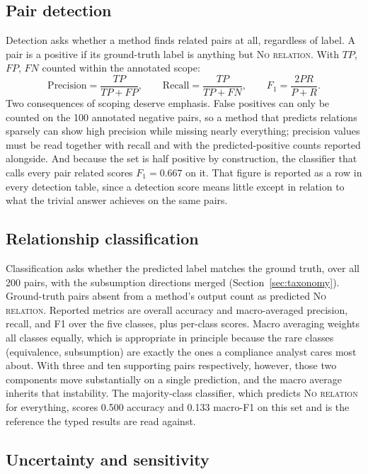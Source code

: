 \subsection{Pair detection}

Detection asks whether a method finds related pairs at all, regardless of
label. A pair is a positive if its ground-truth label is anything but
\textsc{No relation}. With $TP$, $FP$, $FN$ counted within the annotated
scope:
\begin{equation}
  \text{Precision} = \frac{TP}{TP+FP}, \qquad
  \text{Recall} = \frac{TP}{TP+FN}, \qquad
  F_1 = \frac{2PR}{P+R}.
\end{equation}
Two consequences of scoping deserve emphasis. False positives can only be
counted on the 100 annotated negative pairs, so a method that predicts relations
sparsely can show high precision while missing nearly everything; precision
values must be read together with recall and with the predicted-positive counts
reported alongside. And because the set is half positive by construction, the
classifier that calls every pair related scores $F_1 = 0.667$ on it. That figure
is reported as a row in every detection table, since a detection score means
little except in relation to what the trivial answer achieves on the same
pairs.

\subsection{Relationship classification}

Classification asks whether the predicted label matches the ground truth,
over all 200 pairs, with the subsumption directions merged
(Section~\ref{sec:taxonomy}). Ground-truth pairs absent from a method's
output count as predicted \textsc{No relation}. Reported metrics are overall
accuracy and macro-averaged precision, recall, and F1 over the five classes,
plus per-class scores. Macro averaging weights all classes equally, which is
appropriate in principle because the rare classes (equivalence, subsumption) are
exactly the ones a compliance analyst cares most about. With three and ten
supporting pairs respectively, however, those two components move substantially
on a single prediction, and the macro average inherits that instability. The
majority-class classifier, which predicts \textsc{No relation} for everything,
scores 0.500 accuracy and 0.133 macro-F1 on this set and is the reference the
typed results are read against.

\subsection{Uncertainty and sensitivity}

